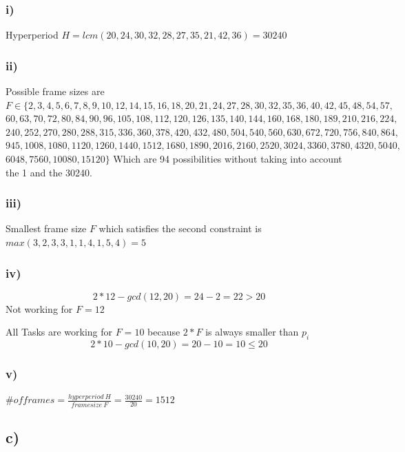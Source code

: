 \documentclass[10pt,a4paper]{article}
\begin{document}
\subsubsection*{i)}
Hyperperiod $H = lcm(20,24,30,32,28,27,35,21,42,36) = 30240$

\subsubsection*{ii)}
Possible frame sizes are
\newline
$F\in \{2, 3, 4, 5, 6, 7, 8, 9, 10, 12, 14, 15, 16, 18, 20, 21, 24, 27, 28, 30, 32, 35, 36, 40, 42, 45, 48, 54, 57,$
$60, 63, 70, 72, 80, 84, 90, 96, 105, 108, 112, 120, 126, 135, 140, 144, 160, 168, 180, 189, 210, 216, 224,$
$240, 252, 270, 280, 288, 315, 336, 360, 378, 420, 432, 480, 504, 540, 560, 630, 672, 720, 756, 840, 864,$
$945, 1008, 1080, 1120, 1260, 1440, 1512, 1680, 1890, 2016, 2160, 2520, 3024, 3360, 3780, 4320, 5040,$
$6048, 7560, 10080, 15120\}$
\newline
Which are 94 possibilities without taking into account the 1 and the 30240.

\subsubsection*{iii)}
Smallest frame size $F$ which satisfies the second constraint is $max(3, 2, 3, 3, 1, 1, 4, 1, 5, 4) = 5$

\subsubsection*{iv)}
\begin{equation}
2 * 12 - gcd(12, 20) = 24 - 2 = 22 > 20
\end{equation}
Not working for $F=12$

All Tasks are working for $F=10$ because $2*F$ is always smaller than $p_i$
\begin{equation}
2 * 10 - gcd(10, 20) = 20 - 10 = 10 \leq 20
\end{equation}


\subsubsection*{v)}
$\# of frames = \frac{hyperperiod ~H}{framesize ~F} = \frac{30240}{20} = 1512$ 

\subsection*{c)}
\end{document}
